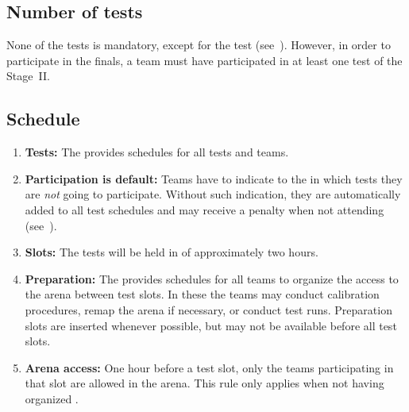 \subsection{Number of tests}\label{rule:number_of_tests}
None of the tests is mandatory, except for the  test (see~). However, in order to participate in the finals, a team must have participated in at least one test of the Stage~II.


\subsection{Schedule}
\label{rule:schedule}

\begin{enumerate}
	\item \textbf{Tests:} The  provides schedules for all tests and teams.
	\item \textbf{Participation is default:} Teams have to indicate to the  in which tests they are \emph{not} going to participate. Without such indication, they are automatically added to all test schedules and may receive a penalty when not attending (see~).
	\item \textbf{Slots:} The tests will be held in  of approximately two hours.
	\item \textbf{Preparation:} The  provides schedules for all teams to organize the access to the arena between test slots. In these  the teams may conduct calibration procedures, remap the arena if necessary, or conduct test runs.
	Preparation slots are inserted whenever possible, but may not be available before all test slots.
	\item \textbf{Arena access:} One hour before a test slot, only the teams participating in that slot are allowed in the arena.
This rule only applies when not having organized .
\end{enumerate}


